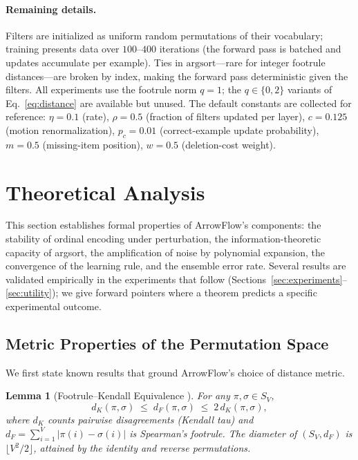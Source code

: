 \documentclass[12pt]{article}
\newcommand{\argsort}{\mathrm{argsort}}
\newtheorem{lemma}[theorem]{Lemma}
\begin{document}
\paragraph{Remaining details.}
Filters are initialized as uniform random permutations of their vocabulary; training presents data over $100$--$400$ iterations (the forward pass is batched and updates accumulate per example). Ties in $\argsort$---rare for integer footrule distances---are broken by index, making the forward pass deterministic given the filters. All experiments use the footrule norm $q = 1$; the $q \in \{0, 2\}$ variants of Eq.~\eqref{eq:distance} are available but unused. The default constants are collected for reference: $\eta = 0.1$ (rate), $\rho = 0.5$ (fraction of filters updated per layer), $c = 0.125$ (motion renormalization), $p_c = 0.01$ (correct-example update probability), $m = 0.5$ (missing-item position), $w = 0.5$ (deletion-cost weight).


\section{Theoretical Analysis}
\label{sec:theory}

This section establishes formal properties of ArrowFlow's components: the stability of ordinal encoding under perturbation, the information-theoretic capacity of argsort, the amplification of noise by polynomial expansion, the convergence of the learning rule, and the ensemble error rate. Several results are validated empirically in the experiments that follow (Sections~\ref{sec:experiments}--\ref{sec:utility}); we give forward pointers where a theorem predicts a specific experimental outcome.

\subsection{Metric Properties of the Permutation Space}

We first state known results that ground ArrowFlow's choice of distance metric.

\begin{lemma}[Footrule--Kendall Equivalence {\citep{diaconis1977footrule}}]
\label{lem:fk-equiv}
For any $\pi, \sigma \in S_V$,
\[
d_K(\pi, \sigma) \;\leq\; d_F(\pi, \sigma) \;\leq\; 2\, d_K(\pi, \sigma),
\]
where $d_K$ counts pairwise disagreements (Kendall tau) and $d_F = \sum_{i=1}^V |\pi(i) - \sigma(i)|$ is Spearman's footrule. The diameter of $(S_V, d_F)$ is $\lfloor V^2/2 \rfloor$, attained by the identity and reverse permutations.
\end{lemma}
\end{document}
